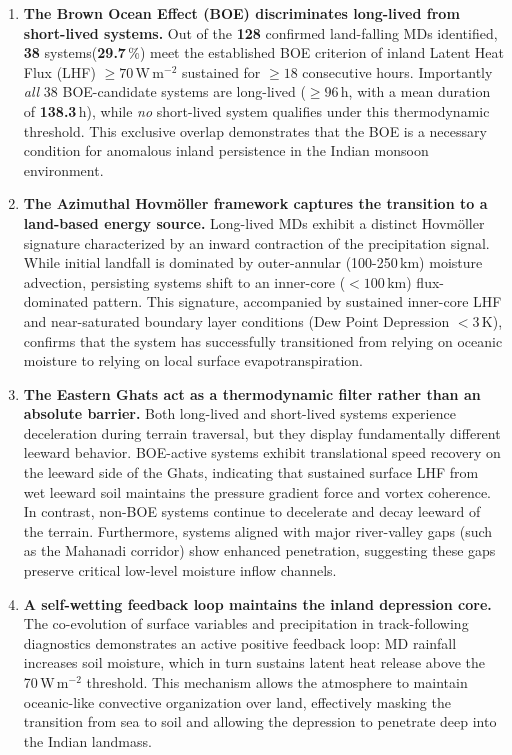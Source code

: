 \begin{enumerate}
  \item \textbf{The Brown Ocean Effect (BOE) discriminates long-lived
    from short-lived systems.}
    Out of the \textbf{128} confirmed land-falling MDs identified,
    \textbf{38} systems(\textbf{29.7}\,\%) meet the established
    BOE criterion of inland Latent Heat Flux (LHF) $\geq
    70$\,W\,m$^{-2}$ sustained for $\geq 18$ consecutive hours.
    Importantly \emph{all} 38 BOE-candidate systems are long-lived
    ($\geq 96$\,h, with a mean duration of \textbf{138.3}\,h), while
    \emph{no} short-lived system qualifies under this thermodynamic
    threshold. This exclusive overlap demonstrates that the BOE is a
    necessary condition for anomalous inland persistence in the
    Indian monsoon environment.
  \item \textbf{The Azimuthal Hovm\"{o}ller framework captures the
    transition to a land-based energy source.}
    Long-lived MDs exhibit a distinct Hovm\"{o}ller signature
    characterized by an inward contraction of the precipitation
    signal. While initial landfall is dominated by outer-annular
    (100-250\,km) moisture advection, persisting systems shift to an
    inner-core ($<100$\,km) flux-dominated pattern. This signature,
    accompanied by sustained inner-core LHF and near-saturated
    boundary layer conditions (Dew Point Depression $<3$\,K),
    confirms that the system has successfully transitioned from
    relying on oceanic moisture to relying on local surface evapotranspiration.
  \item \textbf{The Eastern Ghats act as a thermodynamic filter
    rather than an absolute barrier.}
    Both long-lived and short-lived systems experience deceleration
    during terrain traversal, but they display fundamentally
    different leeward behavior. BOE-active systems exhibit
    translational speed recovery on the leeward side of the Ghats,
    indicating that sustained surface LHF from wet leeward soil
    maintains the pressure gradient force and vortex coherence. In
    contrast, non-BOE systems continue to decelerate and decay
    leeward of the terrain. Furthermore, systems aligned with major
    river-valley gaps (such as the Mahanadi corridor) show enhanced
    penetration, suggesting these gaps preserve critical low-level
    moisture inflow channels.
  \item \textbf{A self-wetting feedback loop maintains the inland
    depression core.}
    The co-evolution of surface variables and precipitation in
    track-following diagnostics demonstrates an active positive
    feedback loop: MD rainfall increases soil moisture, which in turn
    sustains latent heat release above the 70\,W\,m$^{-2}$ threshold.
    This mechanism allows the atmosphere to maintain oceanic-like
    convective organization over land, effectively masking the
    transition from sea to soil and allowing the depression to
    penetrate deep into the Indian landmass.
\end{enumerate}

